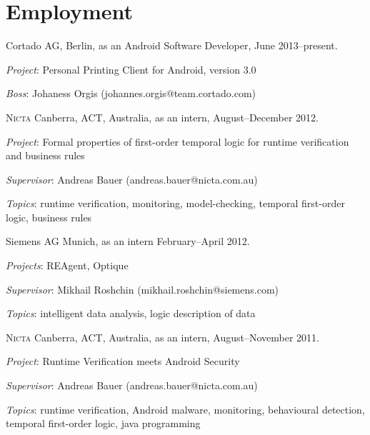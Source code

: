 \documentclass[letterpaper]{article}
\renewenvironment{itemize}{
  \begin{list}{}{
    \setlength{\leftmargin}{1.5em}
  }
}{
  \end{list}
}
\begin{document}

\section*{Employment}
\begin{itemize}
\item Cortado AG, Berlin, as an Android Software Developer, June 2013--present.
\begin{itemize}
      \item {\it Project}: Personal Printing Client for Android, version 3.0
      \item {\it Boss}: Johaness Orgis (johannes.orgis@team.cortado.com)
\end{itemize}
\item \textsc{Nicta} Canberra, ACT, Australia, as an intern, August--December 2012. 
\begin{itemize}
      \item {\it Project}: Formal properties of first-order temporal logic for runtime verification and business rules
      \item {\it Supervisor}: Andreas Bauer (andreas.bauer@nicta.com.au)
      \item {\it Topics}: runtime verification, monitoring, model-checking, temporal first-order logic, business rules
\end{itemize}
\item Siemens AG Munich, as an intern February--April 2012.
\begin{itemize}
      \item {\it Projects}: REAgent, Optique
	  \item {\it Supervisor}: Mikhail Roshchin (mikhail.roshchin@siemens.com)
	  \item {\it Topics}: intelligent data analysis, logic description of data
\end{itemize}
\item \textsc{Nicta} Canberra, ACT, Australia, as an intern, August--November 2011. 
\begin{itemize}
      \item {\it Project}: Runtime Verification meets Android Security
      \item {\it Supervisor}: Andreas Bauer (andreas.bauer@nicta.com.au)
      \item {\it Topics}: runtime verification, Android malware, monitoring, behavioural detection, temporal first-order logic, java programming
\end{itemize}
\end{itemize}
\end{document}
